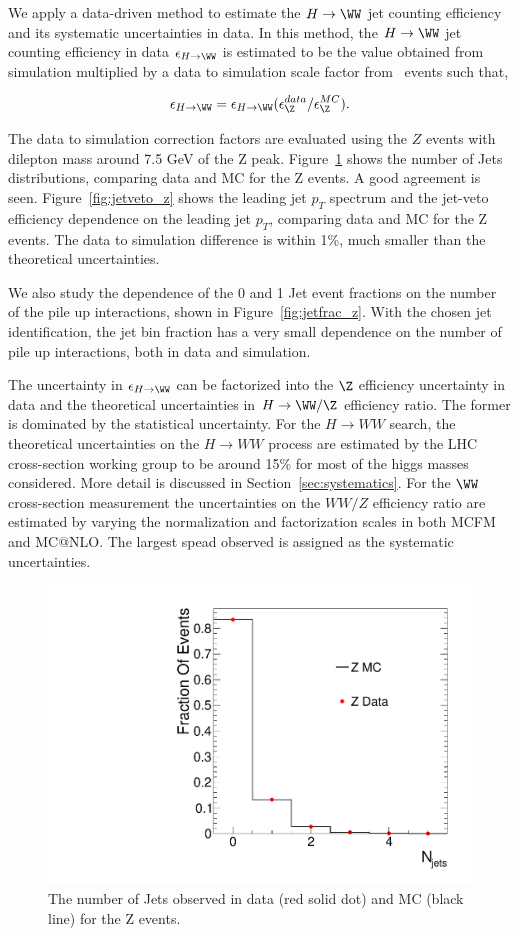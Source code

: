 We apply a data-driven method to estimate the $H \to \WW$ jet counting 
efficiency and its systematic uncertainties in data. 
In this method, the $H \to \WW$ jet counting efficiency in data $\epsilon_{H \to \WW}$
is estimated to be the value obtained from simulation multiplied by a data to simulation
scale factor from \dyll~events such that,

$$\epsilon_{H \to \WW} =  \epsilon_{H \to \WW} ({\epsilon_{\Z}^{data}}/{\epsilon_{\Z}^{MC}}).$$

The data to simulation correction factors are evaluated using the $Z$ events 
with dilepton mass around 7.5 GeV of the Z peak. 
Figure~\ref{fig:znjets} shows the number of Jets distributions, 
comparing data and MC for the Z events. A good agreement is seen. 
Figure~\ref{fig:jetveto_z} shows the leading jet $p_T$ spectrum and 
the jet-veto efficiency dependence on the leading jet $p_T$, comparing 
data and MC for the Z events. The data to simulation difference is within 1\%, 
much smaller than the theoretical uncertainties. 

We also study the dependence of the 0 and 1 Jet event fractions on the 
number of the pile up interactions, shown in Figure~\ref{fig:jetfrac_z}. 
With the chosen jet identification, the jet bin fraction has a very small
dependence on the number of pile up interactions, both in data and simulation. 

The uncertainty in $\epsilon_{H \to \WW}$ can be factorized into the 
$\Z$ efficiency uncertainty in data and the theoretical uncertainties in 
$H \to \WW/\Z$ efficiency ratio. 
The former is dominated by the statistical uncertainty. 
For the $H\to WW$ search, the theoretical uncertainties on the $H\to WW$ process are 
estimated by the LHC cross-section working group to be around 15\% for most of the higgs masses 
considered. More detail is discussed in Section~\ref{sec:systematics}. 
For the $\WW$ cross-section measurement the uncertainties on the $WW/Z$ efficiency ratio 
are estimated by varying the normalization and factorization scales in both 
MCFM and MC@NLO. The largest spead observed is assigned as the systematic uncertainties. 


\begin{figure}[!hbtp]
\centering
\includegraphics[width=.4\textwidth]{figures/Znjets.pdf}
\caption{The number of Jets observed in data (red solid dot) and MC (black line) for the Z events. }
\label{fig:znjets}
\end{figure}

